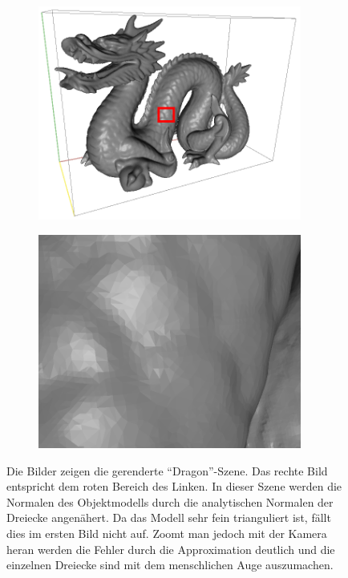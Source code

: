 		\begin{figure}[h]
			\begin{subfigure}[b]{0.5\textwidth}
				\center
				\includegraphics[width=0.95\textwidth]{pic/normal_facette-mark.png}
			\end{subfigure}
			\begin{subfigure}[b]{0.5\textwidth}
				\center
				\includegraphics[width=0.95\textwidth]{pic/normal_facette-zoom.png}
			\end{subfigure}
			\caption{Die Bilder zeigen die gerenderte \enquote{Dragon}-Szene. Das rechte Bild entspricht dem roten Bereich des Linken. In dieser Szene werden die Normalen des Objektmodells durch die analytischen Normalen der Dreiecke angenähert. Da das Modell sehr fein trianguliert ist, fällt dies im ersten Bild nicht auf. Zoomt man jedoch mit der Kamera heran werden die Fehler durch die Approximation deutlich und die einzelnen Dreiecke sind mit dem menschlichen Auge auszumachen.}
			\label{fig:facette}
		\end{figure}

